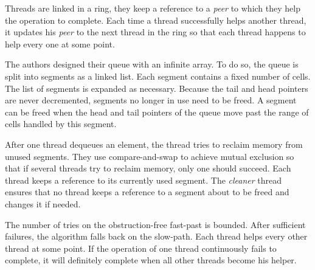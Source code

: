 Threads are linked in a ring, they keep a reference to a \textit{peer} to which
they help the operation to complete. Each time a thread successfully helps
another thread, it updates his \textit{peer} to the next thread in the ring so
that each
thread happens to help every one at some point. \medskip

 The authors designed their queue with an infinite
array. To do so, the queue is split into segments as a linked list. Each segment
contains a fixed number of cells. The list of segments is expanded as necessary.
Because the tail and head pointers are never decremented, segments no longer in
use need to be freed. A segment can be freed when the head and tail pointers of
the queue move past the range of cells handled by this segment.

After one thread dequeues an element, the thread tries to reclaim memory from
unused segments. They use compare-and-swap to achieve mutual exclusion so that
if several threads try to reclaim memory, only one should succeed. Each thread
keeps a reference to its currently used segment. The \textit{cleaner} thread
ensures that no thread keeps a reference to a segment about to be freed and
changes it if needed. \medskip

 The number of tries on the obstruction-free fast-past
is bounded. After sufficient failures, the algorithm falls back on the
slow-path. Each thread helps every other thread at some point. If the operation
of one thread continuously fails to complete, it will definitely complete when
all other threads become his helper.
